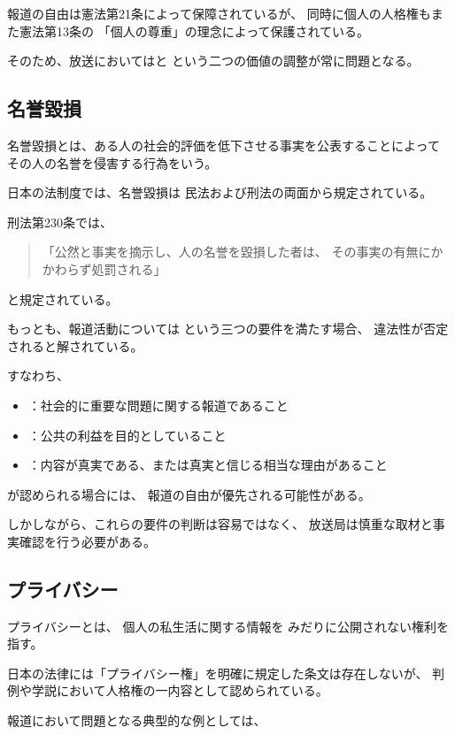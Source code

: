 報道の自由は憲法第21条によって保障されているが、
同時に個人の人格権もまた憲法第13条の
「個人の尊重」の理念によって保護されている。

そのため、放送においてはと
という二つの価値の調整が常に問題となる。

\subsection{名誉毀損}

名誉毀損とは、ある人の社会的評価を低下させる事実を公表することによって
その人の名誉を侵害する行為をいう。

日本の法制度では、名誉毀損は
民法および刑法の両面から規定されている。

刑法第230条では、

\begin{quote}
「公然と事実を摘示し、人の名誉を毀損した者は、
その事実の有無にかかわらず処罰される」
\end{quote}

と規定されている。

もっとも、報道活動については
という三つの要件を満たす場合、
違法性が否定されると解されている。

すなわち、

\begin{itemize}
  \item {}：社会的に重要な問題に関する報道であること
  \item {}：公共の利益を目的としていること
  \item {}：内容が真実である、または真実と信じる相当な理由があること
\end{itemize}

が認められる場合には、
報道の自由が優先される可能性がある。

しかしながら、これらの要件の判断は容易ではなく、
放送局は慎重な取材と事実確認を行う必要がある。

\subsection{プライバシー}

プライバシーとは、
個人の私生活に関する情報を
みだりに公開されない権利を指す。

日本の法律には「プライバシー権」を明確に規定した条文は存在しないが、
判例や学説において人格権の一内容として認められている。

報道において問題となる典型的な例としては、

